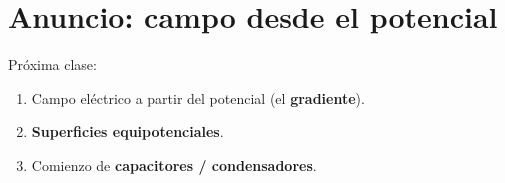 \documentclass[12pt,a4paper]{article}
\begin{document}
\section{Anuncio: campo desde el potencial}

Próxima clase:
\begin{enumerate}[nosep]
  \item Campo eléctrico a partir del potencial (el \textbf{gradiente}).
  \item \textbf{Superficies equipotenciales}.
  \item Comienzo de \textbf{capacitores / condensadores}.
\end{enumerate}
\end{document}
